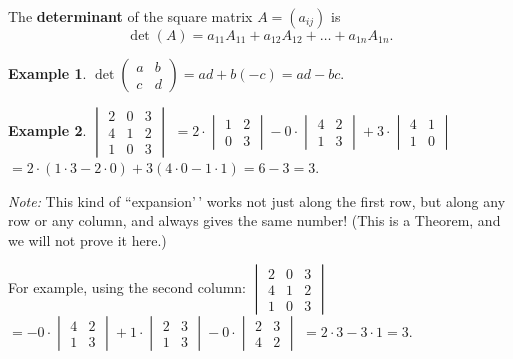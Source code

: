 \documentclass[
  12pt,
  oneside]{book}
\theoremstyle{definition}
\theoremstyle{definition}
\newtheorem{example}{Example}[chapter]
\theoremstyle{definition}
\theoremstyle{definition}
\theoremstyle{remark}
\begin{document}
The \textbf{determinant} of the square matrix \(A=(a_{ij})\) is
\[
\det(A) = a_{11}A_{11} + a_{12}A_{12} + \dots + a_{1n}A_{1n}.
\]

\begin{example}
\protect\hypertarget{exm:unnamed-chunk-53}{}\label{exm:unnamed-chunk-53}\(\det\begin{pmatrix}a&b\\c&d\end{pmatrix} = ad + b(-c)=ad-bc\).
\end{example}

\begin{example}
\protect\hypertarget{exm:unnamed-chunk-54}{}\label{exm:unnamed-chunk-54}\(\begin{vmatrix}2&0&3\\4&1&2\\1&0&3\end{vmatrix}\)
\(=2\cdot\begin{vmatrix}1&2\\0&3\end{vmatrix} - 0\cdot\begin{vmatrix}4&2\\1&3\end{vmatrix} + 3\cdot\begin{vmatrix}4&1\\1&0\end{vmatrix}\)
\(=2\cdot(1\cdot3-2\cdot0) + 3(4\cdot0-1\cdot1)=6-3=3\).
\end{example}

\emph{Note:} This kind of ``expansion'\,' works not just along the first row, but along any row or any column, and always gives the same number! (This is a Theorem, and we will not prove it here.)

For example, using the second column:
\(\begin{vmatrix}2&0&3\\4&1&2\\1&0&3\end{vmatrix}\)
\(=-0\cdot\begin{vmatrix}4&2\\1&3\end{vmatrix} + 1\cdot\begin{vmatrix}2&3\\1&3\end{vmatrix} - 0\cdot\begin{vmatrix}2&3\\4&2\end{vmatrix}\)
\(=2\cdot3-3\cdot1=3\).
\end{document}
